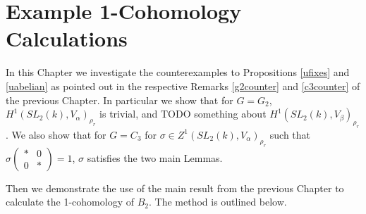 
\chapter{Example 1-Cohomology Calculations}
\label{Chapter6}
In this Chapter we investigate the counterexamples to Propositions \ref{ufixes} and \ref{uabelian} as pointed out in the respective Remarks \ref{g2counter} and \ref{c3counter} of the previous Chapter.
In particular we show that for $G = G_2$, $H^1(SL_2(k), V_\alpha)_{\rho_r}$ is trivial, and TODO something about $H^1(SL_2(k), V_\beta)_{\rho_r}$.
We also show that for $G=C_3$ for $\sigma\in Z^1(SL_2(k), V_\alpha)_{\rho_r}$ such that $\sigma\left(\begin{matrix}* & 0\\0 & *\end{matrix}\right) = 1$, $\sigma$ satisfies the two main Lemmas.

Then we demonstrate the use of the main result from the previous Chapter to calculate the 1-cohomology of $B_2$. The method is outlined below.

